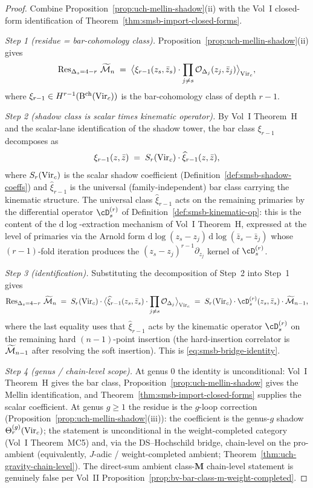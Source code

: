 \begin{proof}
Combine Proposition~\ref{prop:uch-mellin-shadow}(ii) with the Vol~I
closed-form identification of
Theorem~\ref{thm:smsb-import-closed-forms}.

\emph{Step 1 (residue = bar-cohomology class).}
Proposition~\ref{prop:uch-mellin-shadow}(ii) gives
\[
 \operatorname{Res}_{\Delta_s = 4 - r}\,\widetilde{\mathcal M}_n
 \;=\;
 \bigl\langle \xi_{r - 1}(z_s, \bar z_s)\cdot
 \prod_{j \neq s} \mathcal O_{\Delta_j}(z_j, \bar z_j)
 \bigr\rangle_{\mathrm{Vir}_c},
\]
where $\xi_{r - 1} \in H^{r - 1}(\mathrm B^{\mathrm{ch}}(\mathrm{Vir}_c))$ is the bar-cohomology
class of depth $r - 1$.

\emph{Step 2 (shadow class is scalar times kinematic operator).}
By Vol~I Theorem~H and the scalar-lane identification of the shadow
tower, the bar class $\xi_{r - 1}$ decomposes as
\[
 \xi_{r - 1}(z, \bar z)
 \;=\;
 S_r(\mathrm{Vir}_c)\cdot \widehat\xi_{r - 1}(z, \bar z),
\]
where $S_r(\mathrm{Vir}_c)$ is the scalar shadow coefficient
(Definition~\ref{def:smsb-shadow-coeffs}) and $\widehat\xi_{r - 1}$ is
the universal (family-independent) bar class carrying the kinematic
structure. The universal class $\widehat\xi_{r - 1}$ acts on the
remaining primaries by the differential operator $\cD_s^{(r)}$ of
Definition~\ref{def:smsb-kinematic-op}: this is the content of the
$\mathrm d \log$-extraction mechanism of Vol~I Theorem~H, expressed at
the level of primaries via the Arnold form
$\mathrm d \log(z_s - z_j)\,\mathrm d \log(\bar z_s - \bar z_j)$ whose
$(r - 1)$-fold iteration produces the
$(z_s - z_j)^{r - 1}\partial_{z_j}$ kernel of $\cD_s^{(r)}$.

\emph{Step 3 (identification).}
Substituting the decomposition of Step~2 into Step~1 gives
\[
 \Res_{\Delta_s = 4 - r}\,\Mel\cM_n
 \;=\;
 S_r(\Vir_c)\cdot
 \bigl\langle \widehat\xi_{r - 1}(z_s, \bar z_s)\cdot
 \prod_{j \neq s} \cO_{\Delta_j}
 \bigr\rangle_{\Vir_c}
 \;=\;
 S_r(\Vir_c)\cdot \cD_s^{(r)}(z_s, \bar z_s)\cdot \Mel\cM_{n - 1},
\]
where the last equality uses that $\widehat\xi_{r - 1}$ acts by the
kinematic operator $\cD_s^{(r)}$ on the remaining hard
$(n - 1)$-point insertion (the hard-insertion correlator is
$\widetilde{\mathcal M}_{n - 1}$ after resolving the soft insertion). This is
\eqref{eq:smsb-bridge-identity}.

\emph{Step 4 (genus / chain-level scope).}
At genus $0$ the identity is unconditional: Vol~I Theorem~H gives the
bar class, Proposition~\ref{prop:uch-mellin-shadow} gives the Mellin
identification, and Theorem~\ref{thm:smsb-import-closed-forms} supplies
the scalar coefficient. At genus $g \geq 1$ the residue is the $g$-loop
correction (Proposition~\ref{prop:uch-mellin-shadow}(iii)): the
coefficient is the genus-$g$ shadow $\Theta_r^{(g)}(\mathrm{Vir}_c)$; the
statement is unconditional in the weight-completed category (Vol~I
Theorem~MC5) and, via the DS--Hochschild bridge, chain-level on the
pro-ambient (equivalently, $J$-adic / weight-completed ambient;
Theorem~\ref{thm:uch-gravity-chain-level}). The direct-sum ambient
class-$\mathbf M$ chain-level statement is genuinely false per Vol~II
Proposition~\ref{prop:bv-bar-class-m-weight-completed}.
\end{proof}

